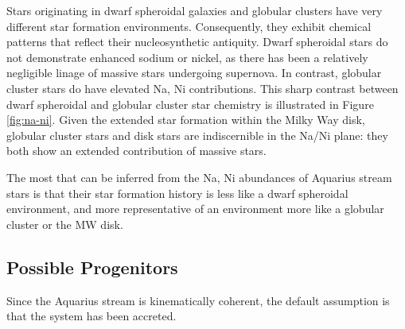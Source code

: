 \documentclass{emulateapj}
\begin{document}
Stars originating in dwarf spheroidal galaxies and globular clusters have very different star formation environments. Consequently, they exhibit chemical patterns that reflect their nucleosynthetic antiquity. Dwarf spheroidal stars do not demonstrate enhanced sodium or nickel, as there has been a relatively negligible linage of massive stars undergoing supernova. In contrast, globular cluster stars do have elevated Na, Ni contributions. This sharp contrast between dwarf spheroidal and globular cluster star chemistry is illustrated in Figure \ref{fig:na-ni}. Given the extended star formation within the Milky Way disk, globular cluster stars and disk stars are indiscernible in the Na/Ni plane: they both show an extended contribution of massive stars. 

The most that can be inferred from the Na, Ni abundances of Aquarius stream stars is that their star formation history is less like a dwarf spheroidal environment, and more representative of an environment more like a globular cluster or the MW disk. 



\subsection{Possible Progenitors}

Since the Aquarius stream is kinematically coherent, the default assumption is that the system has been accreted.










\end{document}
